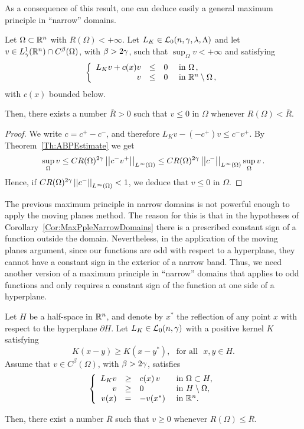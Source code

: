 As a consequence of this result, one can deduce easily a general maximum principle in ``narrow'' domains.

\begin{corollary}
	\label{Cor:MaxPpleNarrowDomains}
	Let $\Omega \subset \mathbb{R}^n$ with $R(\Omega) < +\infty$. Let $L_K \in \mathcal{L}_0(n,\gamma,\lambda, \Lambda)$ and let $v\in L^1_\gamma(\mathbb{R}^n)\cap C^{\beta}(\Omega)$, with $\beta > 2\gamma$, such that $\sup_{\Omega} v < +\infty$ and satisfying
	$$
	\left\{\begin{array}{rcll}
	L_K v + c(x)v &\leq & 0 & \text{ in } \Omega\,, \\
	v & \leq & 0 & \text{ in } \mathbb{R}^n\setminus \Omega\,,
	\end{array} \right.
	$$
	with $c(x)$ bounded below.
	
	Then, there exists a number $\bar{R} > 0$ such that $v \leq 0$ in $\Omega$ whenever $R(\Omega)< \bar{R}$.	
\end{corollary}

\begin{proof}
	We write $c= c^+ - c^-$, and therefore $L_K v -(-c^+)v \leq c^- v^+	$. By Theorem~\ref{Th:ABPEstimate} we get
	$$
	\sup_\Omega v \leq C R(\Omega)^{2\gamma} \left | \left |{c^- v^+} \right | \right |_{L^\infty(\Omega)} \leq C R(\Omega)^{2\gamma} \left | \left |{c^-} \right | \right |_{L^\infty(\Omega)} \sup_\Omega v\,.
	$$
	Hence, if $C R(\Omega)^{2\gamma} \left | \left |{c^-} \right | \right |_{L^\infty(\Omega)}  <1 $, we deduce that $v\leq 0$ in $\Omega$.
\end{proof}


The previous maximum principle in narrow domains is not powerful enough to apply the moving planes method. The reason for this is that in the hypotheses of Corollary~\ref{Cor:MaxPpleNarrowDomains} there is a prescribed constant sign of a function outside the domain. Nevertheless, in the application of the moving planes argument, since our functions are odd with respect to a hyperplane, they cannot have a constant sign in the exterior of a narrow band. Thus, we need another version of a maximum principle in ``narrow'' domains that applies to odd functions and only requires a constant sign of the function at one side of a hyperplane.

\begin{proposition}
	\label{Prop:MaxPrpNarrowOdd}
	Let $H$ be a half-space in $\mathbb{R}^n$, and denote by $x^*$ the reflection of any point $x$ with respect to the hyperplane $\partial H$. Let $L_K \in \mathcal{L}_0(n,\gamma)$ with a positive kernel $K$ satisfying
	\begin{equation}
	\label{Eq:KernelSymmetry}
	K(x-y) \geq K(x-y^*), \,\,\,\,\text{for all } \,\, x,y\in H.
	\end{equation}
	Assume that $v\in C^{\beta}(\Omega)$, with $\beta > 2\gamma$, satisfies
	\begin{equation*}
	\left\{\begin{array}{rcll}
	L_K  v &\geq& c(x)\,v  &\textrm{ in } \Omega\subset H,\\
	v &\geq& 0 &\textrm{ in } H\setminus\Omega,\\
	v(x) &=& -v(x^*) &\textrm{ in } \mathbb{R}^n.
	\end{array} \right.
	\end{equation*}
	
	Then, there exist a number $\overline{R}$ such that $v \geq 0$ whenever $R(\Omega) \leq \overline{R}$.
\end{proposition}

